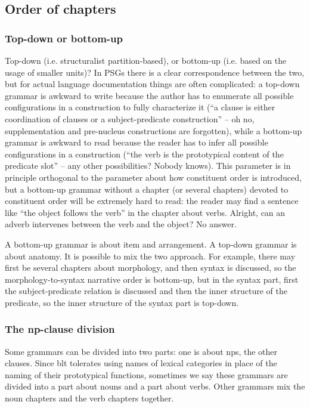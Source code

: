 \documentclass[UTF8, a4paper, oneside, scheme=plain]{ctexart}
\begin{document}
\subsection{Order of chapters}

\subsubsection{Top-down or bottom-up}

Top-down (i.e. structuralist partition-based), 
or bottom-up (i.e. based on the usage of smaller units)? 
In PSGs there is a clear correspondence between the two, 
but for actual language documentation things are often complicated:
a top-down grammar is awkward to write 
because the author has to enumerate all possible configurations in a construction 
to fully characterize it
(``a clause is either coordination of clauses or a subject-predicate construction''
-- oh no, supplementation and pre-nucleus constructions are forgotten),
while a bottom-up grammar is awkward to read 
because the reader has to infer all possible configurations in a construction 
(``the verb is the prototypical content of the predicate slot''
-- any other possibilities? Nobody knows).
This parameter is in principle orthogonal to the parameter about how constituent order is introduced,
but a bottom-up grammar without a chapter (or several chapters) devoted to constituent order 
will be extremely hard to read:
the reader may find a sentence like ``the object follows the verb'' in the chapter about verbs.
Alright, can an adverb intervenes between the verb and the object? No answer.

A bottom-up grammar is about item and arrangement.
A top-down grammar is about anatomy.
It is possible to mix the two approach.
For example, there may first be several chapters about morphology,
and then syntax is discussed,
so the morphology-to-syntax narrative order is bottom-up,
but in the syntax part,
first the subject-predicate relation is discussed 
and then the inner structure of the predicate,
so the inner structure of the syntax part is top-down.

\subsubsection{The \ac{np}-clause division}\label{sec:np-clause-chapter}

Some grammars can be divided into two parts:
one is about \ac{np}s,
the other clauses.
Since \ac{blt} tolerates using names of lexical categories in place of the naming of their prototypical functions,
sometimes we say these grammars are divided into 
a part about nouns and a part about verbs.
Other grammars mix the noun chapters and the verb chapters together.
\end{document}
